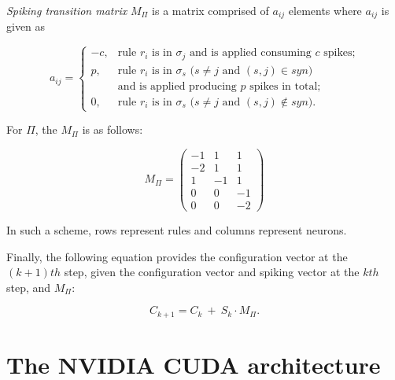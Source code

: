 \documentclass{svmultm}
\begin{document}
\textit{Spiking transition matrix} $M_{\Pi}$ is a matrix comprised of $a_{ij}$
elements where $a_{ij}$ is given as

\pagebreak

\begin{definition}\label{defi-snp-mat}
$$
a_{ij} = \left\{
\begin{array}{rl}
-c, &\mbox{rule $r_i$ is in $\sigma_j$ and is applied consuming $c$ spikes;} \\
 p, &\mbox{rule $r_i$ is in $\sigma_s$ ($s\neq j$ and $(s,j)\in syn$)} \\
 & \mbox{and is applied producing $p$ spikes in total;}\\
 0, &\mbox{rule $r_i$ is in $\sigma_s$ ($s\neq j$ and $(s,j)\notin syn$).}
    \end{array}
\right.
$$
\end{definition}

For $\Pi$, the $M_{\Pi}$ is as follows:

\begin{equation}\label{snp_mat}
M_{\Pi} = \left(
\begin{array}{ccc}
  -1 & 1 & 1\\
  -2 & 1 &  1 \\
   1 &  -1 & 1 \\
   0 & 0 & -1\\
   0 & 0& -2
\end{array}\right)
\end{equation}

In such a scheme, rows represent rules and columns
represent neurons. 

Finally, the following equation provides the configuration
vector at the $(k+1)th$ step, given the configuration vector and
spiking vector at the $kth$ step, and $M_{\Pi}$:

\begin{equation}\label{next-config}
C_{k+1} =  C_{k} ~ + ~ S_{k}\cdot M_{\Pi}.
\end{equation}


\section{The NVIDIA CUDA architecture}

\end{document}
